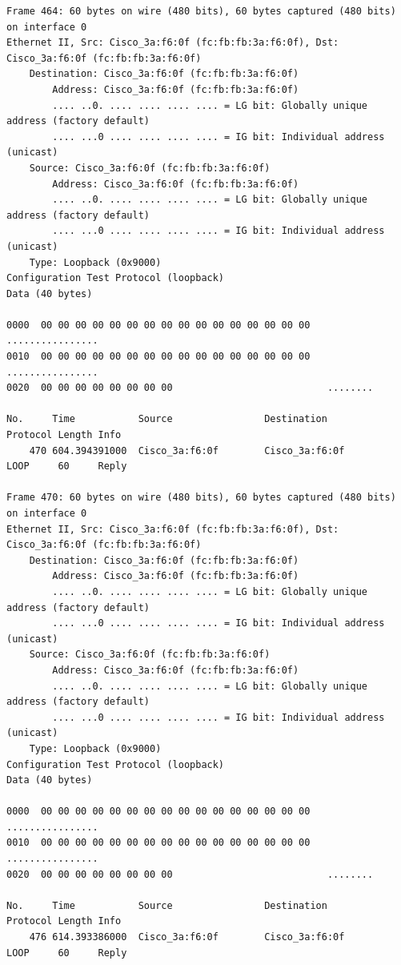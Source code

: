 \documentclass[a4paper,11pt]{article}
\begin{document}
\begin{lstlisting}
Frame 464: 60 bytes on wire (480 bits), 60 bytes captured (480 bits) on interface 0
Ethernet II, Src: Cisco_3a:f6:0f (fc:fb:fb:3a:f6:0f), Dst: Cisco_3a:f6:0f (fc:fb:fb:3a:f6:0f)
    Destination: Cisco_3a:f6:0f (fc:fb:fb:3a:f6:0f)
        Address: Cisco_3a:f6:0f (fc:fb:fb:3a:f6:0f)
        .... ..0. .... .... .... .... = LG bit: Globally unique address (factory default)
        .... ...0 .... .... .... .... = IG bit: Individual address (unicast)
    Source: Cisco_3a:f6:0f (fc:fb:fb:3a:f6:0f)
        Address: Cisco_3a:f6:0f (fc:fb:fb:3a:f6:0f)
        .... ..0. .... .... .... .... = LG bit: Globally unique address (factory default)
        .... ...0 .... .... .... .... = IG bit: Individual address (unicast)
    Type: Loopback (0x9000)
Configuration Test Protocol (loopback)
Data (40 bytes)

0000  00 00 00 00 00 00 00 00 00 00 00 00 00 00 00 00   ................
0010  00 00 00 00 00 00 00 00 00 00 00 00 00 00 00 00   ................
0020  00 00 00 00 00 00 00 00                           ........

No.     Time           Source                Destination           Protocol Length Info
    470 604.394391000  Cisco_3a:f6:0f        Cisco_3a:f6:0f        LOOP     60     Reply

Frame 470: 60 bytes on wire (480 bits), 60 bytes captured (480 bits) on interface 0
Ethernet II, Src: Cisco_3a:f6:0f (fc:fb:fb:3a:f6:0f), Dst: Cisco_3a:f6:0f (fc:fb:fb:3a:f6:0f)
    Destination: Cisco_3a:f6:0f (fc:fb:fb:3a:f6:0f)
        Address: Cisco_3a:f6:0f (fc:fb:fb:3a:f6:0f)
        .... ..0. .... .... .... .... = LG bit: Globally unique address (factory default)
        .... ...0 .... .... .... .... = IG bit: Individual address (unicast)
    Source: Cisco_3a:f6:0f (fc:fb:fb:3a:f6:0f)
        Address: Cisco_3a:f6:0f (fc:fb:fb:3a:f6:0f)
        .... ..0. .... .... .... .... = LG bit: Globally unique address (factory default)
        .... ...0 .... .... .... .... = IG bit: Individual address (unicast)
    Type: Loopback (0x9000)
Configuration Test Protocol (loopback)
Data (40 bytes)

0000  00 00 00 00 00 00 00 00 00 00 00 00 00 00 00 00   ................
0010  00 00 00 00 00 00 00 00 00 00 00 00 00 00 00 00   ................
0020  00 00 00 00 00 00 00 00                           ........

No.     Time           Source                Destination           Protocol Length Info
    476 614.393386000  Cisco_3a:f6:0f        Cisco_3a:f6:0f        LOOP     60     Reply


\end{lstlisting}
\end{document}
